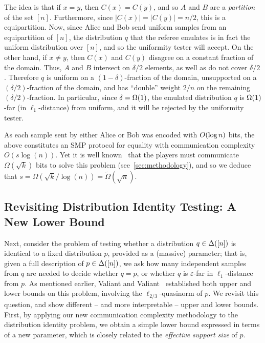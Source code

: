 \documentclass[11pt]{article}
\theoremstyle{remark}   	\newtheorem{remark}[theorem]{Remark}
\theoremstyle{definition}   	\newaliascnt{defn}{theorem}
\newcommand{\eps}{\ensuremath{\varepsilon}\xspace}
\newcommand{\bigO}[1]{{O\mleft( #1 \mright)}}
\newcommand{\bigOmega}[1]{{\Omega\mleft( #1 \mright)}}
\newcommand{\abs}[1]{\left\lvert #1 \right\rvert}
\newcommand{\lp}[1][1]{\ell_{#1}}
\begin{document}
The idea is that if $x=y$, then $C(x)=C(y)$, and so $A$ and $B$ are a \emph{partition} of the set $[n]$. Furthermore, since $\abs{C(x)} = \abs{C(y)} = n/2$, this is a equipartition. Now, since Alice and Bob send uniform samples from an equipartition of $[n]$, the distribution $q$ that the referee emulates is in fact the uniform distribution over $[n]$, and so the uniformity tester will accept. On the other hand, if $x\neq y$, then $C(x)$ and $C(y)$ disagree on a constant fraction of the domain. Thus, $A$ and $B$ intersect on $\delta/2$ elements, as well as do not cover $\delta/2$. Therefore $q$ is uniform on a $(1-\delta)$-fraction of the domain, unsupported on a $(\delta/2)$-fraction of the domain, and has ``double'' weight $2/n$ on the remaining $(\delta/2)$-fraction. In particular, since $\delta = \bigOmega{1}$, the emulated distribution $q$ is $\bigOmega{1}$-far (in $\lp[1]$-distance) from uniform, and it will be rejected by the uniformity tester.

As each sample sent by either Alice or Bob was encoded with $\bigO{\log n}$ bits, the above constitutes an SMP protocol for equality with communication complexity $O(s \log(n))$.  Yet it is well known~\cite{newman1996public} that the players must communicate $\Omega(\sqrt{k})$ bits to solve this problem (see~\autoref{sec:methodology}), and so we deduce that $s = \Omega(\sqrt{k}/\log(n)) = \tilde\Omega(\sqrt{n})$.

\subsection{Revisiting Distribution Identity Testing: A New Lower Bound}
\label{sec:overview:lb}
Next, consider the problem of testing whether a distribution $q\in\Delta\!\left([n]\right)$ is identical to a fixed distribution $p$, provided as a (massive) parameter; that is, given a full description of $p\in\Delta\!\left([n]\right)$, we ask how many independent samples from $q$ are needed to decide whether $q=p$, or whether $q$ is $\eps$-far in $\lp[1]$-distance from $p$. As mentioned earlier, Valiant and Valiant~\cite{VV:14} established both upper and lower bounds on this problem, involving the $\lp[2/3]$-quasinorm of $p$. We revisit this question, and show different -- and more interpretable -- upper and lower bounds. First, by applying our new communication complexity methodology to the distribution identity problem, we obtain a simple lower bound expressed in terms of a new parameter, which is closely related to the \emph{effective support size} of $p$.
\end{document}
